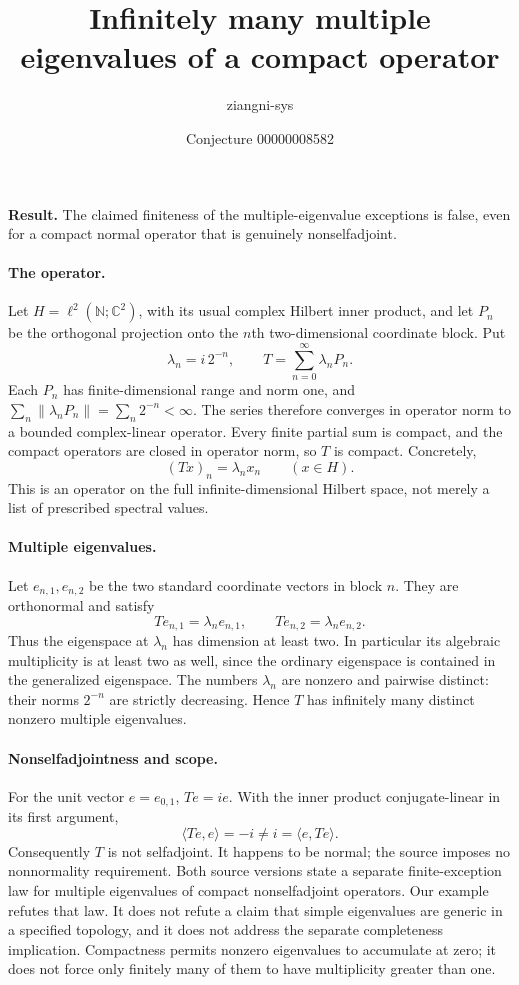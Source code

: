 \documentclass[11pt]{article}
\title{Infinitely many multiple eigenvalues of a compact operator}
\author{ziangni-sys}
\date{Conjecture 00000008582}
\begin{document}
\raggedright
\maketitle
\noindent\textbf{Result.} The claimed finiteness of the multiple-eigenvalue exceptions is false, even for a compact normal operator that is genuinely nonselfadjoint.

\paragraph{The operator.}
Let $H=\ell^2(\mathbb N;\mathbb C^2)$, with its usual complex Hilbert inner product, and let $P_n$ be the orthogonal projection onto the $n$th two-dimensional coordinate block. Put
\[
 \lambda_n=i\,2^{-n},\qquad
 T=\sum_{n=0}^{\infty}\lambda_nP_n.
\]
Each $P_n$ has finite-dimensional range and norm one, and
$\sum_n\|\lambda_nP_n\|=\sum_n2^{-n}<\infty$.
The series therefore converges in operator norm to a bounded complex-linear operator. Every finite partial sum is compact, and the compact operators are closed in operator norm, so $T$ is compact. Concretely,
\[
 (Tx)_n=\lambda_n x_n\qquad (x\in H).
\]
This is an operator on the full infinite-dimensional Hilbert space, not merely a list of prescribed spectral values.

\paragraph{Multiple eigenvalues.}
Let $e_{n,1},e_{n,2}$ be the two standard coordinate vectors in block $n$. They are orthonormal and satisfy
\[
 Te_{n,1}=\lambda_ne_{n,1},\qquad
 Te_{n,2}=\lambda_ne_{n,2}.
\]
Thus the eigenspace at $\lambda_n$ has dimension at least two. In particular its algebraic multiplicity is at least two as well, since the ordinary eigenspace is contained in the generalized eigenspace. The numbers $\lambda_n$ are nonzero and pairwise distinct: their norms $2^{-n}$ are strictly decreasing. Hence $T$ has infinitely many distinct nonzero multiple eigenvalues.

\paragraph{Nonselfadjointness and scope.}
For the unit vector $e=e_{0,1}$, $Te=ie$. With the inner product conjugate-linear in its first argument,
\[
 \langle Te,e\rangle=-i\ne i=\langle e,Te\rangle.
\]
Consequently $T$ is not selfadjoint. It happens to be normal; the source imposes no nonnormality requirement. Both source versions state a separate finite-exception law for multiple eigenvalues of compact nonselfadjoint operators. Our example refutes that law. It does not refute a claim that simple eigenvalues are generic in a specified topology, and it does not address the separate completeness implication. Compactness permits nonzero eigenvalues to accumulate at zero; it does not force only finitely many of them to have multiplicity greater than one.
\end{document}
